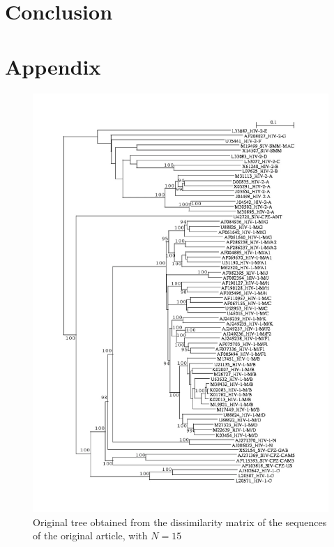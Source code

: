 \documentclass[english,13pt,a4paper]{article}
\theoremstyle{definition}
\theoremstyle{remark}
\theoremstyle{defstyle}
\begin{document}
\section{Conclusion}


\newpage

\section*{Appendix}

\begin{figure}[H]
    \centering
    \includegraphics[width=\textwidth]{../Trees/original_66_tree.png}
    \caption{Original tree obtained from the dissimilarity matrix of the sequences of the original article, with $N = 15$}
    \label{fig:original_tree66}
\end{figure}
\end{document}
